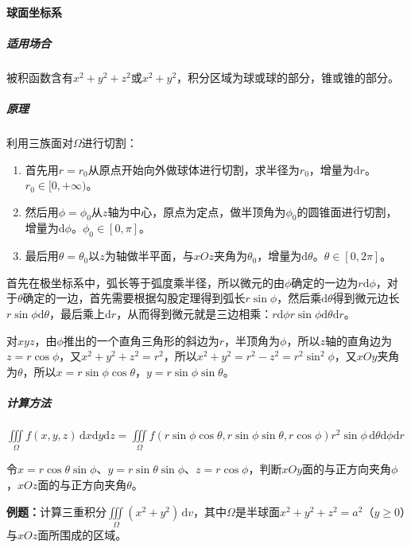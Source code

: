 \documentclass[UTF8, 12pt]{ctexart}
\begin{document}
        \paragraph{球面坐标系} \leavevmode \medskip

        \subparagraph{适用场合} \leavevmode \medskip

        被积函数含有$x^2+y^2+z^2$或$x^2+y^2$，积分区域为球或球的部分，锥或锥的部分。

        \subparagraph{原理} \leavevmode \medskip

        利用三族面对$\Omega$进行切割：

        \begin{enumerate}
            \item 首先用$r=r_0$从原点开始向外做球体进行切割，求半径为$r_0$，增量为$\textrm{d}r$。$r_0\in[0,+\infty)$。
            \item 然后用$\phi=\phi_0$从$z$轴为中心，原点为定点，做半顶角为$\phi_0$的圆锥面进行切割，增量为$\textrm{d}\phi$。$\phi_0\in[0,\pi]$。
            \item 最后用$\theta=\theta_0$以$z$为轴做半平面，与$xOz$夹角为$\theta_0$，增量为$\textrm{d}\theta$。$\theta\in[0,2\pi]$。
        \end{enumerate}

        首先在极坐标系中，弧长等于弧度乘半径，所以微元的由$\phi$确定的一边为$r\textrm{d}\phi$，对于$\theta$确定的一边，首先需要根据勾股定理得到弧长$r\sin\phi$，然后乘$\textrm{d}\theta$得到微元边长$r\sin\phi\textrm{d}\theta$，最后乘上$\textrm{d}r$，从而得到微元就是三边相乘：$r\textrm{d}\phi r\sin\phi\textrm{d}\theta\textrm{d}r$。

        对$xyz$，由$\phi$推出的一个直角三角形的斜边为$r$，半顶角为$\phi$，所以$z$轴的直角边为$z=r\cos\phi$，又$x^2+y^2+z^2=r^2$，所以$x^2+y^2=r^2-z^2=r^2\sin^2\phi$，又$xOy$夹角为$\theta$，所以$x=r\sin\phi\cos\theta$，$y=r\sin\phi\sin\theta$。

        \subparagraph{计算方法} \leavevmode \medskip

        $\iiint\limits_\Omega f(x,y,z)\,\textrm{d}x\textrm{d}y\textrm{d}z=\iiint\limits_\Omega f(r\sin\phi\cos\theta,r\sin\phi\sin\theta,r\cos\phi)r^2\sin\phi\,\textrm{d}\theta\textrm{d}\phi\textrm{d}r$

        令$x=r\cos\theta\sin\phi$、$y=r\sin\theta\sin\phi$、$z=r\cos\phi$，判断$xOy$面的与正方向夹角$\phi$，$xOz$面的与正方向夹角$\theta$。

        \textbf{例题：}计算三重积分$\iiint\limits_\Omega(x^2+y^2)\,\textrm{d}v$，其中$\Omega$是半球面$x^2+y^2+z^2=a^2$（$y\geqslant0$）与$xOz$面所围成的区域。
\end{document}
